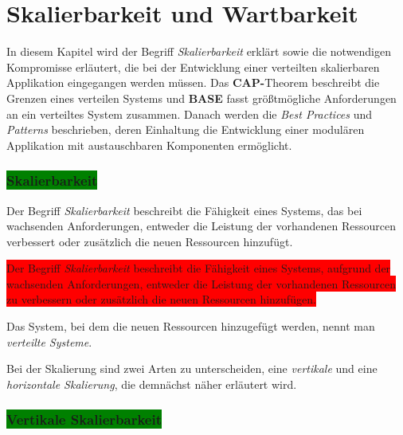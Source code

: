 \chapter{Skalierbarkeit und Wartbarkeit}

In diesem Kapitel wird der Begriff \textit{Skalierbarkeit} erklärt sowie die notwendigen Kompromisse erläutert, die bei der Entwicklung einer verteilten skalierbaren Applikation eingegangen werden müssen. Das \textbf{CAP-}Theorem beschreibt die Grenzen eines verteilen Systems und \textbf{BASE} fasst größtmögliche Anforderungen an ein verteiltes System zusammen. Danach werden die \textit{Best Practices} und \textit{Patterns} beschrieben, deren Einhaltung die Entwicklung einer modulären Applikation mit austauschbaren Komponenten ermöglicht. 

\subsection{\colorbox{green}{Skalierbarkeit}}\label{scale}

Der Begriff \textit{Skalierbarkeit} beschreibt die Fähigkeit eines Systems, das bei wachsenden Anforderungen, entweder die Leistung der vorhandenen Ressourcen verbessert oder zusätzlich die neuen Ressourcen hinzufügt.

\colorbox{red}{Der Begriff \textit{Skalierbarkeit} beschreibt die Fähigkeit eines Systems, aufgrund der wachsenden Anforderungen, entweder die Leistung der vorhandenen Ressourcen zu verbessern oder zusätzlich die neuen Ressourcen hinzufügen.}

Das System, bei dem die neuen Ressourcen hinzugefügt werden, nennt man \textit{verteilte Systeme}.

Bei der Skalierung sind zwei Arten zu unterscheiden, eine \textit{vertikale} und eine \textit{horizontale Skalierung}, die demnächst näher erläutert wird.

\subsection{\colorbox{green}{Vertikale Skalierbarkeit}}

